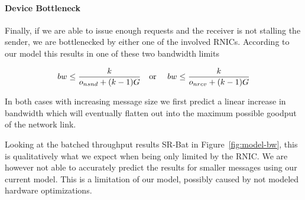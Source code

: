 \pagebreak
\paragraph{Device Bottleneck} Finally, if we are able to issue enough requests and the receiver is not stalling the sender,
we are bottlenecked by either one of the involved RNICs. According to our model this results in one of these two
bandwidth limits

$$
bw \leq \frac{k}{o_{nsnd} + (k-1)G} \text{\quad or \quad} bw \leq \frac{k}{o_{nrcv} + (k-1)G}
$$

In both cases with increasing message size we first predict a linear increase in bandwidth which will eventually 
flatten out into the maximum possible goodput of the network link.

Looking at the batched throughput results SR-Bat in Figure~\ref{fig:model-bw}, this is qualitatively what we expect 
when being only limited by the RNIC. We are however not able to accurately predict the results for smaller messages 
using our current model. This is a limitation of our model,  possibly caused by not modeled hardware optimizations.
